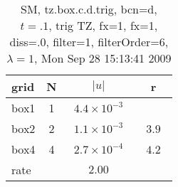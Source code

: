 \begin{table}[hbt]\tableFont %
\begin{center}
\begin{tabular}{|l|c|c|c|} \hline 
grid  & N &  $\vert u \vert$   & r \\ \hline 
                box1 &     1 & ~$4.4\times10^{ -3}$~ &            \\ \hline
                box2 &     2 & ~$1.1\times10^{ -3}$~ & ~$  3.9$~  \\ \hline
                box4 &     4 & ~$2.7\times10^{ -4}$~ & ~$  4.2$~  \\ \hline
    rate             &       &       $2.00$         &        \\ \hline
\end{tabular}
\caption{SM, tz.box.c.d.trig, bcn=d, $t=.1$, trig TZ, fx=1, fx=1, diss=.0, filter=1, filterOrder=6, $\lambda=1$, Mon Sep 28 15:13:41 2009}\label{table:tz.box.c.d.trig}
\end{center}
\end{table}
